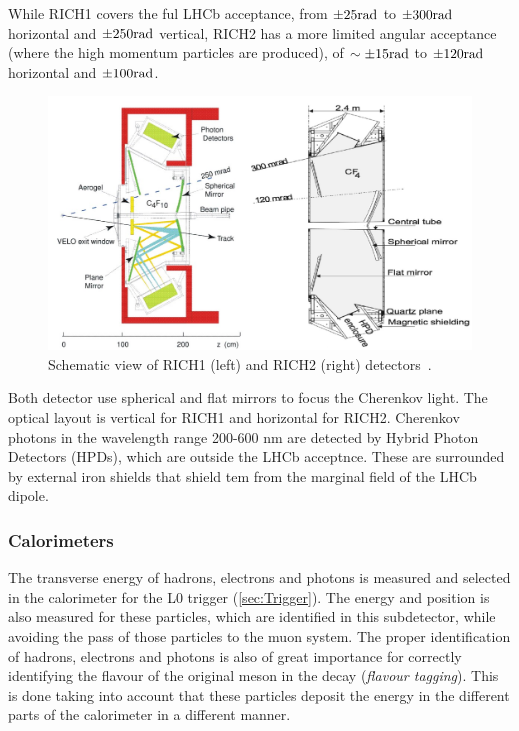 While RICH1 covers the ful LHCb acceptance, from $\pm 25 \rm rad$ to $\pm 300 \rm rad$ horizontal and $\pm 250 \rm rad$ vertical, RICH2 has a more limited angular acceptance (where the high momentum particles are produced), of $\sim \pm 15 \rm rad$ to $\pm 120 \rm rad$ horizontal and $\pm 100 \rm rad$.

\begin{figure} [htb!]
\begin{center}
\includegraphics[scale=1.5]{figs/RICH.png}
\caption{Schematic view of  RICH1 (left) and RICH2 (right) detectors~\cite{Alves:2008zz}.\label{fig:lhcb_rich}}
\end{center}
\end{figure}

Both detector use spherical and flat mirrors to focus the Cherenkov light. The optical layout is vertical for RICH1 and horizontal for RICH2. Cherenkov photons in the wavelength range 200-600 nm are detected by Hybrid Photon Detectors (HPDs), which are outside the LHCb acceptnce. These are surrounded by external iron shields that shield tem from the marginal field of the LHCb dipole. 

\subsubsection{Calorimeters} %
The transverse energy of hadrons, electrons and photons is measured and selected in the calorimeter for the L0 trigger (\ref{sec:Trigger}). The energy and position is also measured for these particles, which are identified in this subdetector, while avoiding the pass of those particles to the muon system. The proper identification of hadrons, electrons and photons is also of great importance for correctly identifying the flavour of the original meson in the decay (\textit{flavour tagging}). This is done taking into account that these particles deposit the energy in the different parts of the calorimeter in a different manner. 
 
